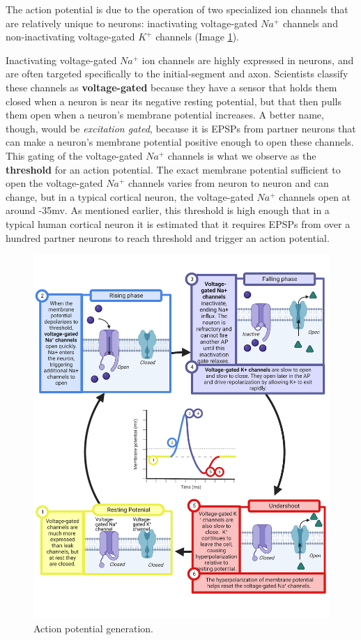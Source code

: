 \documentclass[
]{book}
\begin{document}
The action potential is due to the operation of two specialized ion channels that are relatively unique to neurons: inactivating voltage-gated \(Na^+\) channels and non-inactivating voltage-gated \(K^+\) channels (Image \ref{fig:action-potential-generation}).

Inactivating voltage-gated \(Na^+\) ion channels are highly expressed in neurons, and are often targeted specifically to the initial-segment and axon. Scientists classify these channels as \textbf{voltage-gated} because they have a sensor that holds them closed when a neuron is near its negative resting potential, but that then pulls them open when a neuron's membrane potential increases. A better name, though, would be \emph{excitation gated}, because it is EPSPs from partner neurons that can make a neuron's membrane potential positive enough to open these channels. This gating of the voltage-gated \(Na^+\) channels is what we observe as the \textbf{threshold} for an action potential. The exact membrane potential sufficient to open the voltage-gated \(Na^+\) channels varies from neuron to neuron and can change, but in a typical cortical neuron, the voltage-gated \(Na^+\) channels open at around -35mv. As mentioned earlier, this threshold is high enough that in a typical human cortical neuron it is estimated that it requires EPSPs from over a hundred partner neurons to reach threshold and trigger an action potential.

\begin{figure}

{\centering \includegraphics[width=0.9\linewidth]{images/ch02/02_25} 

}

\caption{Action potential generation.}\label{fig:action-potential-generation}
\end{figure}
\end{document}
